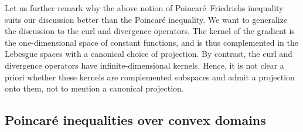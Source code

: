 \documentclass[a4paper]{amsart}
\begin{document}
\begin{remark}
    Let us further remark why the above notion of Poincar\'e--Friedrichs inequality suits our discussion better than the Poincar\'e inequality. 
    We want to generalize the discussion to the curl and divergence operators. 
    The kernel of the gradient is the one-dimensional space of constant functions, and is thus complemented in the Lebesgue spaces with a canonical choice of projection. 
    By contrast, the curl and divergence operators have infinite-dimensional kernels. 
    Hence, it is not clear a priori whether these kernels are complemented subspaces and admit a projection onto them, not to mention a canonical projection. 
\end{remark}




\subsection{Poincar\'e inequalities over convex domains}
\end{document}
